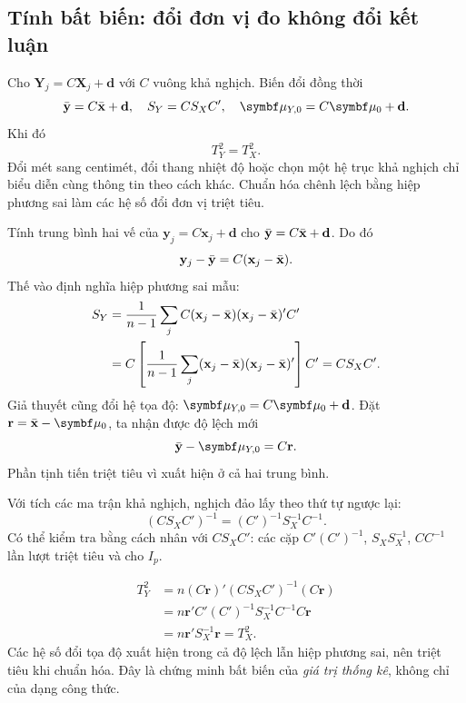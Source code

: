
\subsection{Tính bất biến: đổi đơn vị đo không đổi kết luận}
\label{sec:invariance_proof}
Cho $\mathbf Y_j=C\mathbf X_j+\mathbf d$ với $C$ vuông khả nghịch.
Biến đổi đồng thời
\[
 \bar{\mathbf y}=C\xbar+\mathbf d,\quad S_Y=CS_XC',\quad
 \vmu_{Y,0}=C\vmu_0+\mathbf d.
\]
Khi đó
\begin{equation}
 T_Y^2=T_X^2.
 \label{eq:invariance}
\end{equation}
Đổi mét sang centimét, đổi thang nhiệt độ hoặc chọn một hệ trục khả nghịch
chỉ biểu diễn cùng thông tin theo cách khác. Chuẩn hóa chênh lệch bằng
hiệp phương sai làm các hệ số đổi đơn vị triệt tiêu.

Tính trung bình hai vế của $\mathbf y_j=C\mathbf x_j+\mathbf d$ cho
$\bar{\mathbf y}=C\bar{\mathbf x}+\mathbf d$. Do đó
\[
 \mathbf y_j-\bar{\mathbf y}=C(\mathbf x_j-\bar{\mathbf x}).
\]
Thế vào định nghĩa hiệp phương sai mẫu:
\begin{align*}
 S_Y&=\frac1{n-1}\sum_j
 C(\mathbf x_j-\bar{\mathbf x})(\mathbf x_j-\bar{\mathbf x})'C'\\
 &=C\left[\frac1{n-1}\sum_j
 (\mathbf x_j-\bar{\mathbf x})(\mathbf x_j-\bar{\mathbf x})'\right]C'=CS_XC'.
\end{align*}
Giả thuyết cũng đổi hệ tọa độ:
$\vmu_{Y,0}=C\vmu_0+\mathbf d$.
Đặt $\mathbf r=\xbar-\vmu_0$, ta nhận được độ lệch mới
\[
 \bar{\mathbf y}-\vmu_{Y,0}=C\mathbf r.
\]
Phần tịnh tiến triệt tiêu vì xuất hiện ở cả hai trung bình.

Với tích các ma trận khả nghịch, nghịch đảo lấy theo thứ tự ngược lại:
\[
 (CS_XC')^{-1}=(C')^{-1}S_X^{-1}C^{-1}.
\]
Có thể kiểm tra bằng cách nhân với $CS_XC'$: các cặp
$C'(C')^{-1}$, $S_XS_X^{-1}$, $CC^{-1}$ lần lượt triệt tiêu và cho $I_p$.

\begin{align*}
 T_Y^2
 &=n(C\mathbf r)'(CS_XC')^{-1}(C\mathbf r)\\
 &=n\mathbf r'C'(C')^{-1}S_X^{-1}C^{-1}C\mathbf r\\
 &=n\mathbf r'S_X^{-1}\mathbf r=T_X^2.
\end{align*}
Các hệ số đổi tọa độ xuất hiện trong cả độ lệch lẫn hiệp phương sai,
nên triệt tiêu khi chuẩn hóa. Đây là chứng minh bất biến của \emph{giá
trị thống kê}, không chỉ của dạng công thức.

